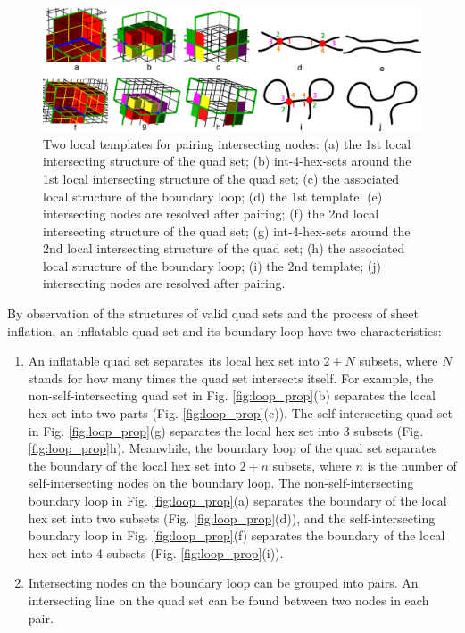 \documentclass[final,5p,times,twocolumn]{elsarticle}
\begin{document}
\begin{figure}[htbp]
\begin{center}
\includegraphics[width=17cm]{figures/pair_patterns.png}
\caption{Two local templates for pairing intersecting nodes: (a) the 1st local intersecting structure of the quad set; (b) int-4-hex-sets around the 1st local intersecting structure of the quad set; (c) the associated local structure of the boundary loop; (d) the 1st template; (e) intersecting nodes are resolved after pairing; (f) the 2nd local intersecting structure of the quad set; (g) int-4-hex-sets around the 2nd local intersecting structure of the quad set; (h) the associated local structure of the boundary loop; (i) the 2nd template; (j) intersecting nodes are resolved after pairing.}
\label{fig:int_pair_tpl}
\end{center}
\end{figure}

By observation of the structures of valid quad sets and the process of sheet inflation, an inflatable quad set and its boundary loop have two characteristics:

\begin{enumerate}
\item An inflatable quad set separates its local hex set into $2+N$ subsets, where $N$ stands for how many times the quad set intersects itself. For example, the non-self-intersecting quad set in Fig. \ref{fig:loop_prop}(b) separates the local hex set into two parts (Fig. \ref{fig:loop_prop}(c)). The self-intersecting quad set in Fig. \ref{fig:loop_prop}(g) separates the local hex set into 3 subsets (Fig. \ref{fig:loop_prop}h). Meanwhile, the boundary loop of the quad set separates the boundary of the local hex set into $2+n$ subsets, where $n$ is the number of self-intersecting nodes on the boundary loop. The non-self-intersecting boundary loop in Fig. \ref{fig:loop_prop}(a) separates the boundary of the local hex set into two subsets (Fig. \ref{fig:loop_prop}(d)), and the self-intersecting boundary loop in Fig. \ref{fig:loop_prop}(f) separates the boundary of the local hex set into 4 subsets (Fig. \ref{fig:loop_prop}(i)).

\item Intersecting nodes on the boundary loop can be grouped into pairs. An intersecting line on the quad set can be found between two nodes in each pair.
\end{enumerate}
\end{document}
